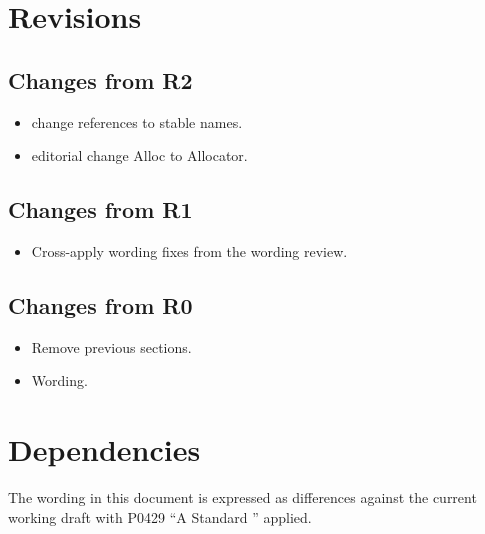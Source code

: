 \section{Revisions}

\subsection{Changes from R2}

\begin{itemize}
  \item change references to stable names.
  \item editorial change Alloc to Allocator.
\end{itemize}

\subsection{Changes from R1}

\begin{itemize}
  \item Cross-apply wording fixes from the  wording review.
\end{itemize}

\subsection{Changes from R0}

\begin{itemize}
  \item Remove previous sections.
  \item Wording.
\end{itemize}

\section{Dependencies}

The wording in this document is expressed as differences against the current
working draft with P0429 ``A Standard '' applied.
